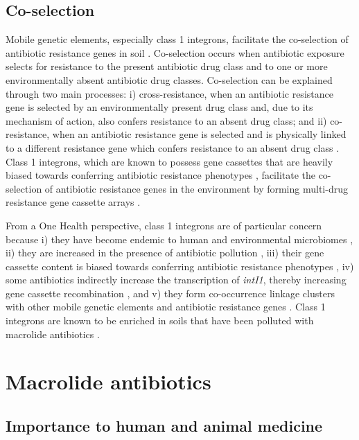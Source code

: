 \subsection{Co-selection}

Mobile genetic elements, especially class 1 integrons, facilitate the co-selection of antibiotic resistance genes in soil \parencite{Pal.2015}.
Co-selection occurs when antibiotic exposure selects for resistance to the present antibiotic drug class and to one or more environmentally absent antibiotic drug classes.
Co-selection can be explained through two main processes: i) cross-resistance, when an antibiotic resistance gene is selected by an environmentally present drug class and, due to its mechanism of action, also confers resistance to an absent drug class; and ii) co-resistance, when an antibiotic resistance gene is selected and is physically linked to a different resistance gene which confers resistance to an absent drug class \parencite{Wales.2015}.
Class 1 integrons, which are known to possess gene cassettes that are heavily biased towards conferring antibiotic resistance phenotypes \parencite{Ghaly.2020, Yang.2021}, facilitate the co-selection of antibiotic resistance genes in the environment by forming multi-drug resistance gene cassette arrays \parencite{Naas.2001}.

From a One Health perspective, class 1 integrons are of particular concern because
i) they have become endemic to human and environmental microbiomes \parencite{Gillings.2017},
ii) they are increased in the presence of antibiotic pollution \parencite{Gillings.2017, Wright.2008, Stalder.2014},
iii) their gene cassette content is biased towards conferring antibiotic resistance phenotypes \parencite{Yang.2021},
iv) some antibiotics indirectly increase the transcription of \textit{intI1}, thereby increasing gene cassette recombination \parencite{Guerin.2009, Baharoglu.2010}, and
v) they form co-occurrence linkage clusters with other mobile genetic elements and antibiotic resistance genes \parencite{Pal.2015}.
Class 1 integrons are known to be enriched in soils that have been polluted with macrolide antibiotics \parencite{Lau.2020}.

\section{Macrolide antibiotics}

\subsection{Importance to human and animal medicine}

